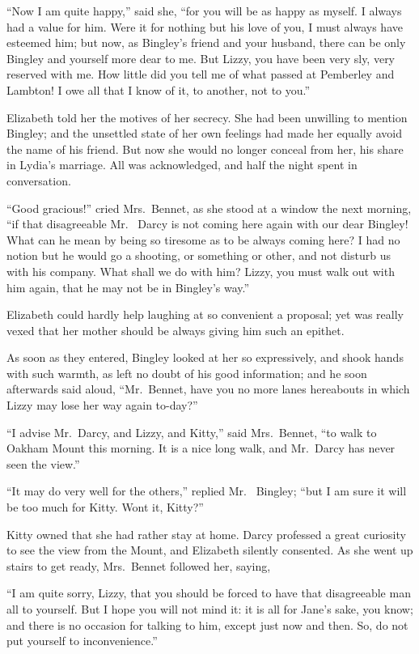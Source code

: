 “Now I am quite happy,” said she, “for you will be as
happy as myself. I always had a value for him. Were
it for nothing but his love of you, I must always have
esteemed him; but now, as Bingley’s friend and your
husband, there can be only Bingley and yourself more
dear to me. But Lizzy, you have been very sly, very
reserved with me. How little did you tell me of what
passed at Pemberley and Lambton! I owe all that
I know of it, to another, not to you.”

Elizabeth told her the motives of her secrecy. She had
been unwilling to mention Bingley; and the unsettled
state of her own feelings had made her equally avoid the
name of his friend. But now she would no longer conceal
from her, his share in Lydia’s marriage. All was acknowledged,
and half the night spent in conversation.

\strut

“Good gracious!” cried Mrs.\ Bennet, as she stood at
a window the next morning, “if that disagreeable Mr.\ %
Darcy is not coming here again with our dear Bingley!
What can he mean by being so tiresome as to be always
coming here? I had no notion but he would go a shooting,
or something or other, and not disturb us with his company.
What shall we do with him? Lizzy, you must
walk out with him again, that he may not be in Bingley’s
way.”

Elizabeth could hardly help laughing at so convenient
a proposal; yet was really vexed that her mother should
be always giving him such an epithet.

As soon as they entered, Bingley looked at her so
expressively, and shook hands with such warmth, as left
no doubt of his good information; and he soon afterwards
said aloud, “Mr.\ Bennet, have you no more lanes hereabouts
in which Lizzy may lose her way again to-day?”

“I advise Mr.\ Darcy, and Lizzy, and Kitty,” said
Mrs.\ Bennet, “to walk to Oakham Mount this morning.
It is a nice long walk, and Mr.\ Darcy has never seen the
view.”

“It may do very well for the others,” replied Mr.\ %
Bingley; “but I am sure it will be too much for Kitty.
Wont it, Kitty?”

Kitty owned that she had rather stay at home. Darcy
professed a great curiosity to see the view from the Mount,
and Elizabeth silently consented. As she went up stairs
to get ready, Mrs.\ Bennet followed her, saying,

“I am quite sorry, Lizzy, that you should be forced
to have that disagreeable man all to yourself. But I hope
you will not mind it: it is all for Jane’s sake, you know;
and there is no occasion for talking to him, except just
now and then. So, do not put yourself to inconvenience.”

